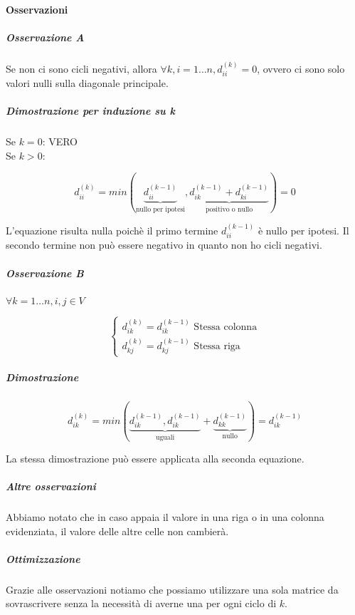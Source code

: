 \paragraph{Osservazioni}

\subparagraph{Osservazione A}

Se non ci sono cicli negativi, allora $\forall k,i = 1\ldots n, d_{ii}^{(k)} = 0$, ovvero ci sono solo valori nulli sulla diagonale principale.

\subparagraph{Dimostrazione per induzione su k}

Se $k=0$: VERO \\
Se $k>0$:

\begin{equation}
d_{ii}^{(k)} = min( \underbrace{d_{ii}^{(k-1)}}_\text{nullo per ipotesi} ,  \underbrace{d_{ik}^{(k-1)} + d_{ki}^{(k-1)}}_\text{positivo o nullo} ) = 0
\end{equation}

L'equazione risulta nulla poichè il primo termine $d_{ii}^{(k-1)}$ è nullo per ipotesi.
Il secondo termine non può essere negativo in quanto non ho cicli negativi.


\subparagraph{Osservazione B}

$\forall k = 1\ldots n,i,j \in V$

\[
\begin{cases} d_{ik}^{(k)} = d_{ik}^{(k-1)} \mbox{ Stessa colonna} \\ d_{kj}^{(k)} = d_{kj}^{(k-1)} \mbox{ Stessa riga} \end{cases}
\]


\subparagraph{Dimostrazione}

\begin{equation}
d_{ik}^{(k)} = min(  \underbrace{ d_{ik}^{(k-1)} , d_{ik}^{(k-1)}  }_\text{uguali} + \underbrace{ d_{kk}^{(k-1)} }_\text{nullo} ) = d_{ik}^{(k-1)}
\end{equation}

La stessa dimostrazione può essere applicata alla seconda equazione.

\subparagraph{Altre osservazioni}
Abbiamo notato che in caso appaia il valore \infty in una riga o in una colonna evidenziata, il valore delle altre celle non cambierà.


\subparagraph{Ottimizzazione}

Grazie alle osservazioni notiamo che possiamo utilizzare una sola matrice da sovrascrivere senza la necessità di averne una per ogni ciclo di $k$.


